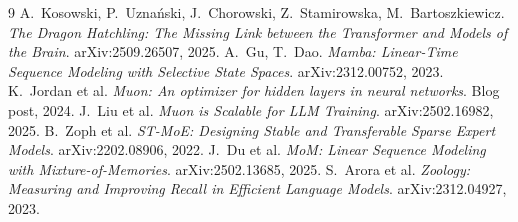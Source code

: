 \documentclass[11pt]{article}
\begin{document}
\begin{thebibliography}{9}
\small
{} A.~Kosowski, P.~Uzna\'nski, J.~Chorowski, Z.~Stamirowska, M.~Bartoszkiewicz. \emph{The Dragon Hatchling: The Missing Link between the Transformer and Models of the Brain}. arXiv:2509.26507, 2025.
 A.~Gu, T.~Dao. \emph{Mamba: Linear-Time Sequence Modeling with Selective State Spaces}. arXiv:2312.00752, 2023.
 K.~Jordan et al. \emph{Muon: An optimizer for hidden layers in neural networks}. Blog post, 2024.
 J.~Liu et al. \emph{Muon is Scalable for LLM Training}. arXiv:2502.16982, 2025.
 B.~Zoph et al. \emph{ST-MoE: Designing Stable and Transferable Sparse Expert Models}. arXiv:2202.08906, 2022.
 J.~Du et al. \emph{MoM: Linear Sequence Modeling with Mixture-of-Memories}. arXiv:2502.13685, 2025.
 S.~Arora et al. \emph{Zoology: Measuring and Improving Recall in Efficient Language Models}. arXiv:2312.04927, 2023.
\end{thebibliography}
\end{document}

